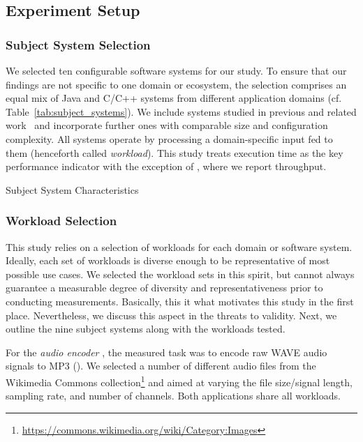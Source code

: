 {
\subsection{Experiment Setup}\label{sec:setup}
\subsubsection{Subject System Selection}
{\color{edited}
We selected ten configurable software systems for our study. To ensure that our findings are not specific to one domain or ecosystem, the selection comprises an equal mix of Java and C/C++ systems from different application domains (cf. Table~\ref{tab:subject_systems}). We include systems studied in previous and related work~\cite{velez_2020_configcrusher_jase,weber_white_2021,alves_sampling_2020} and incorporate further ones with comparable size and configuration complexity. All systems operate by processing a domain-specific input fed to them (henceforth called \textit{workload}). This study treats execution time as the key performance indicator with the exception of \htwo, where we report throughput.

\begin{table}
	\footnotesize
	\centering
	\caption{Subject System Characteristics}
	
	\label{tab:subject_systems}
\end{table}

\subsubsection{Workload Selection}
This study relies on a selection of workloads for each domain or software system. Ideally, each set of workloads is diverse enough to be representative of most possible use cases. We selected the workload sets in this spirit, but cannot always guarantee a measurable degree of diversity and representativeness prior to conducting measurements. Basically, this it what motivates this study in the first place. Nevertheless, we discuss this aspect in the threats to validity. Next, we outline the nine subject systems along with the workloads tested. 

For the \textit{audio encoder} \jumper, the measured task was to encode raw WAVE audio signals to MP3 (\jumper). We selected a number of different audio files from the Wikimedia Commons collection\footnote{\url{https://commons.wikimedia.org/wiki/Category:Images}} and aimed at varying the file size/signal length, sampling rate, and number of channels. Both applications share all workloads.

}}
